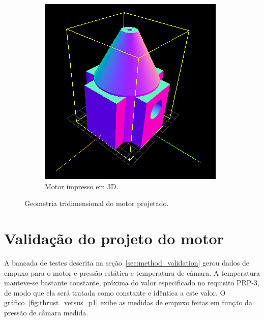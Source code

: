 \begin{figure}[htbp]
\begin{subfigure}{0.49\textwidth}
        \includegraphics[width=\textwidth]{img/motor_stl.png}
        \caption{Motor impresso em 3D.}
    \end{subfigure}
    \caption{Geometria tridimensional do motor projetado.}\label{fig:3d_geom}
\end{figure}

\section{Validação do projeto do motor}\label{sec:result_validation}

A bancada de testes descrita na seção~\ref{sec:method_validation} gerou dados de empuxo para o motor e pressão estática e temperatura de câmara. A temperatura manteve-se bastante constante, próxima do valor especificado no requisito PRP-3, de modo que ela será tratada como constante e idêntica a este valor. O gráfico~\ref{fig:thrust_versus_p1} exibe as medidas de empuxo feitas em função da pressão de câmara medida.

